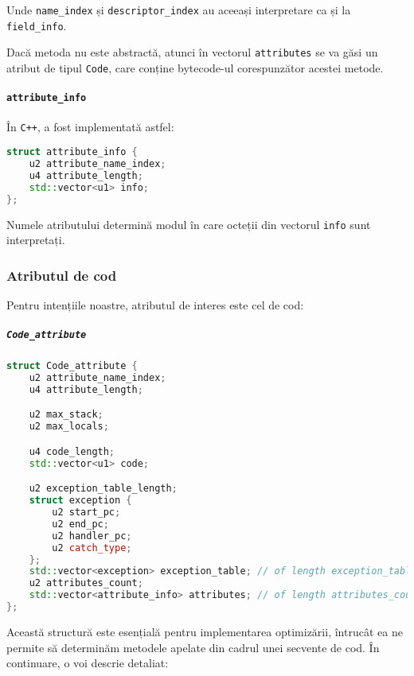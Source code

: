 Unde \texttt{name\_index} și \texttt{descriptor\_index} au aceeași
interpretare ca și la \texttt{field\_info}.

Dacă metoda nu este abstractă, atunci în vectorul \texttt{attributes} se
va găsi un atribut de tipul \texttt{Code}, care conține bytecode-ul
corespunzător acestei metode.

\paragraph{\texorpdfstring{\texttt{attribute\_info}}{attribute\_info}}\label{attribute_info}

În \texttt{C++}, a fost implementată astfel:

\begin{lstlisting}[language=C++]
struct attribute_info {
    u2 attribute_name_index;
    u4 attribute_length;
    std::vector<u1> info;
};
\end{lstlisting}

Numele atributului determină modul în care octeții din vectorul
\texttt{info} sunt interpretați.

\subsubsection{Atributul de cod}

Pentru intențiile noastre, atributul de interes este cel de cod:

\subparagraph{\texorpdfstring{\texttt{Code\_attribute}}{Code\_attribute}}\label{code_attribute}

\begin{lstlisting}[language=C++]
struct Code_attribute {
    u2 attribute_name_index;
    u4 attribute_length;

    u2 max_stack;
    u2 max_locals;

    u4 code_length;
    std::vector<u1> code;

    u2 exception_table_length;
    struct exception {
        u2 start_pc;
        u2 end_pc;
        u2 handler_pc;
        u2 catch_type;
    };
    std::vector<exception> exception_table; // of length exception_table_length.
    u2 attributes_count;
    std::vector<attribute_info> attributes; // of length attributes_count.
};
\end{lstlisting}

Această structură este esențială pentru implementarea optimizării,
întrucât ea ne permite să determinăm metodele apelate din cadrul unei secvente de cod.
În continuare, o voi descrie detaliat:

